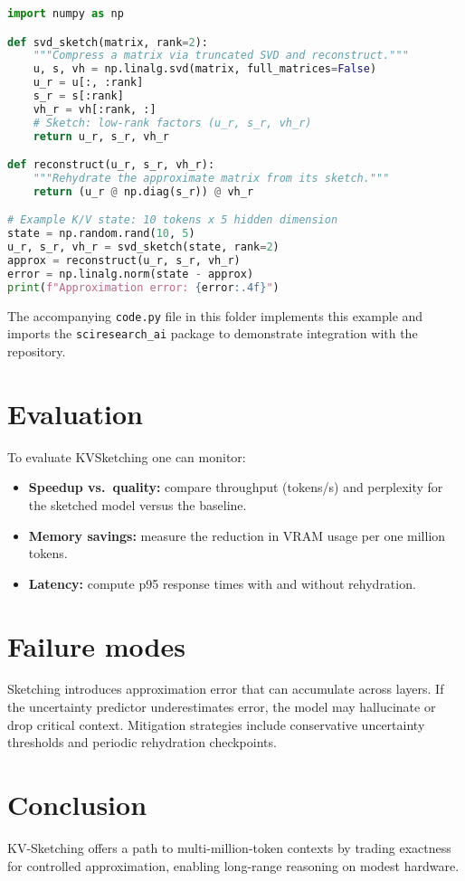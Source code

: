 \documentclass{article}
\begin{document}
\begin{lstlisting}[language=Python, caption={Simple KV\-sketching prototype using SVD.}, label={alg:kvsketch}]
import numpy as np

def svd_sketch(matrix, rank=2):
    """Compress a matrix via truncated SVD and reconstruct."""
    u, s, vh = np.linalg.svd(matrix, full_matrices=False)
    u_r = u[:, :rank]
    s_r = s[:rank]
    vh_r = vh[:rank, :]
    # Sketch: low-rank factors (u_r, s_r, vh_r)
    return u_r, s_r, vh_r

def reconstruct(u_r, s_r, vh_r):
    """Rehydrate the approximate matrix from its sketch."""
    return (u_r @ np.diag(s_r)) @ vh_r

# Example K/V state: 10 tokens x 5 hidden dimension
state = np.random.rand(10, 5)
u_r, s_r, vh_r = svd_sketch(state, rank=2)
approx = reconstruct(u_r, s_r, vh_r)
error = np.linalg.norm(state - approx)
print(f"Approximation error: {error:.4f}")
\end{lstlisting}

The accompanying \texttt{code.py} file in this folder implements this example and imports the \texttt{sciresearch\_ai} package to demonstrate integration with the repository.

\section{Evaluation}
To evaluate KV\-Sketching one can monitor:
\begin{itemize}
  \item \textbf{Speedup vs.\ quality:} compare throughput (tokens/s) and perplexity for the sketched model versus the baseline.
  \item \textbf{Memory savings:} measure the reduction in VRAM usage per one million tokens.
  \item \textbf{Latency:} compute p95 response times with and without rehydration.
\end{itemize}

\section{Failure modes}
Sketching introduces approximation error that can accumulate across layers.  If the uncertainty predictor underestimates error, the model may hallucinate or drop critical context.  Mitigation strategies include conservative uncertainty thresholds and periodic rehydration checkpoints.

\section{Conclusion}
KV-Sketching offers a path to multi-million-token contexts by trading exactness for controlled approximation, enabling long-range reasoning on modest hardware.
\end{document}
